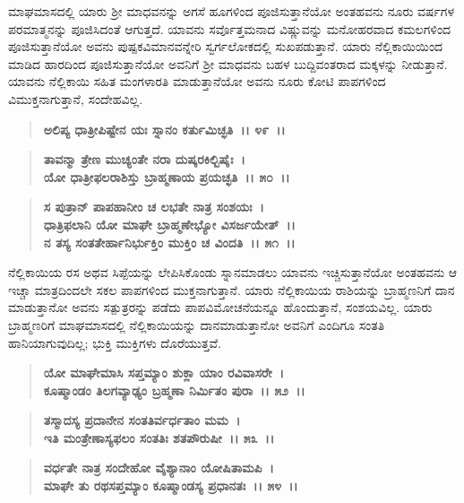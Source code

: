 ಮಾಘಮಾಸದಲ್ಲಿ ಯಾರು ಶ‍್ರೀ ಮಾಧವನನ್ನು ಅಗಸೆ ಹೂಗಳಿಂದ ಪೂಜಿಸುತ್ತಾನೆಯೋ ಅಂತಹವನು ನೂರು ವರ್ಷಗಳ ಪರಮಾತ್ಮನನ್ನು ಪೂಜಿಸಿದಂತೆ ಆಗುತ್ತದೆ. ಯಾವನು ಸರ್ವೊತ್ತಮನಾದ ವಿಷ್ಣುವನ್ನು ಮನೋಹರವಾದ ಕಮಲಗಳಿಂದ ಪೂಜಿಸುತ್ತಾನೆಯೋ ಅವನು ಪುಷ್ಪಕವಿಮಾನವನ್ನೇರಿ ಸ್ವರ್ಗಲೋಕದಲ್ಲಿ ಸುಖಪಡುತ್ತಾನೆ. ಯಾರು ನೆಲ್ಲಿಕಾಯಿಯಿಂದ ಮಾಡಿದ ಹಾರದಿಂದ ಪೂಜಿಸುತ್ತಾನೆಯೋ ಅವನಿಗೆ ಶ‍್ರೀ ಮಾಧವನು ಬಹಳ ಬುದ್ದಿವಂತರಾದ ಮಕ್ಕಳನ್ನು ನೀಡುತ್ತಾನೆ. ಯಾವನು ನೆಲ್ಲಿಕಾಯಿ ಸಹಿತ ಮಂಗಳಾರತಿ ಮಾಡುತ್ತಾನೆಯೋ ಅವನು ನೂರು ಕೋಟಿ ಪಾಪಗಳಿಂದ ವಿಮುಕ್ತನಾಗುತ್ತಾನೆ, ಸಂದೇಹವಿಲ್ಲ.

\begin{verse}
\textbf{ಅಲಿಪ್ಯ ಧಾತ್ರೀಪಿಷ್ಟೇನ ಯಃ ಸ್ನಾನಂ ಕರ್ತುಮಿಚ್ಛತಿ~।। ೪೯~।।} 
\end{verse}

\begin{verse}
\textbf{ತಾವನ್ಮಾ ತ್ರೇಣ ಮುಚ್ಯಂತೇ ನರಾ ದುಷ್ಕರಕಿಲ್ಬಿಷೈಃ~।}\\\textbf{ಯೋ ಧಾತ್ರೀಫಲರಾಶಿಸ್ತು ಬ್ರಾಹ್ಮಣಾಯ ಪ್ರಯಚ್ಛತಿ~।। ೫೦~।।}
\end{verse}

\begin{verse}
\textbf{ಸ ಪುತ್ರಾನ್ ಪಾಪಹಾನೀಂ ಚ ಲಭತೇ ನಾತ್ರ ಸಂಶಯಃ~।}\\\textbf{ಧಾತ್ರಿಫಲಾನಿ ಯೋ ಮಾಘೇ ಬ್ರಾಹ್ಮಣೇಭ್ಯೋ ವಿಸರ್ಜಯೇತ್~।।}\\\textbf{ನ ತಸ್ಯ ಸಂತತೇರ್ಹಾನಿರ್ಭುಕ್ತಿಂ ಮುಕ್ತಿಂ ಚ ವಿಂದತಿ~।। ೫೧~।।}
\end{verse}

ನೆಲ್ಲಿಕಾಯಿಯ ರಸ ಅಥವ ಸಿಪ್ಪೆಯನ್ನು ಲೇಪಿಸಿಕೊಂಡು ಸ್ನಾನಮಾಡಲು ಯಾವನು ಇಚ್ಚಿಸುತ್ತಾನೆಯೋ ಅಂತಹವನು ಆ ಇಚ್ಚಾ ಮಾತ್ರದಿಂದಲೇ ಸಕಲ ಪಾಪಗಳಿಂದ ಮುಕ್ತನಾಗುತ್ತಾನೆ. ಯಾರು ನೆಲ್ಲಿಕಾಯಿಯ ರಾಶಿಯನ್ನು ಬ್ರಾಹ್ಮಣನಿಗೆ ದಾನ ಮಾಡುತ್ತಾನೋ ಅವನು ಸತ್ಪುತ್ರರನ್ನು ಪಡೆದು ಪಾಪವಿಮೋಚನೆಯನ್ನೂ ಹೊಂದುತ್ತಾನೆ, ಸಂಶಯವಿಲ್ಲ. ಯಾರು ಬ್ರಾಹ್ಮಣರಿಗೆ ಮಾಘಮಾಸದಲ್ಲಿ ನೆಲ್ಲಿಕಾಯಿಯನ್ನು ದಾನಮಾಡುತ್ತಾನೋ ಅವನಿಗೆ ಎಂದಿಗೂ ಸಂತತಿ ಹಾನಿಯಾಗುವುದಿಲ್ಲ; ಭುಕ್ತಿ ಮುಕ್ತಿಗಳು ದೊರೆಯುತ್ತವೆ.

\begin{verse}
\textbf{ಯೋ ಮಾಘೇಮಾಸಿ ಸಪ್ತಮ್ಯಾಂ ಶುಕ್ಲಾ ಯಾಂ ರವಿವಾಸರೇ~।}\\\textbf{ಕೂಷ್ಮಾಂಡಂ ತಿಲಗವ್ಯಾಢ್ಯಂ ಬ್ರಹ್ಮಣಾ ನಿರ್ಮಿತಂ ಪುರಾ~।। ೫೨~।। }
\end{verse}

\begin{verse}
\textbf{ತಸ್ಮಾದಸ್ಯ ಪ್ರದಾನೇನ ಸಂತತಿರ್ವರ್ಧತಾಂ ಮಮ~।}\\\textbf{ಇತಿ ಮಂತ್ರೇಣಾಸ್ಯಫಲಂ ಸಂತತಿಃ ಶತಪೌರುಷೀ~।। ೫೩~।। }
\end{verse}

\begin{verse}
\textbf{ವರ್ಧತೇ ನಾತ್ರ ಸಂದೇಹೋ ವೈಶ್ಯಾನಾಂ ಯೋಷಿತಾಮಪಿ~।}\\\textbf{ಮಾಘೇ ತು ರಥಸಪ್ತಮ್ಯಾಂ ಕೂಷ್ಮಾಂಡಸ್ಯ ಪ್ರಧಾನತಃ~।। ೫೪~।। }
\end{verse}


